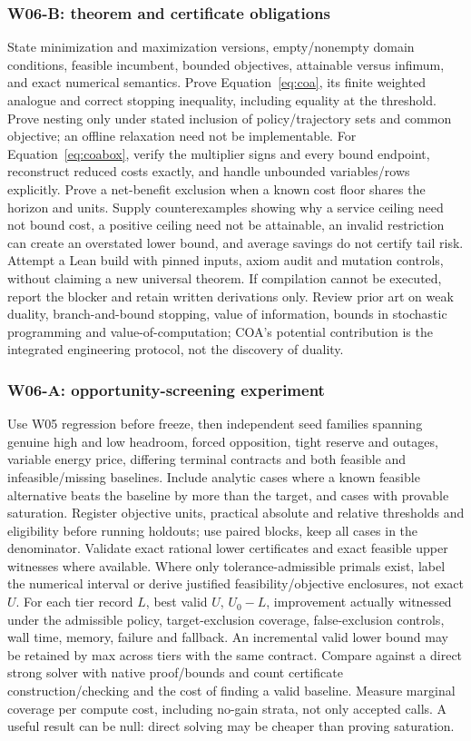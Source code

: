 \subsubsection{W06-B: theorem and certificate obligations}
State minimization and maximization versions, empty/nonempty domain conditions, feasible incumbent, bounded objectives, attainable versus infimum, and exact numerical semantics. Prove Equation~\ref{eq:coa}, its finite weighted analogue and correct stopping inequality, including equality at the threshold. Prove nesting only under stated inclusion of policy/trajectory sets and common objective; an offline relaxation need not be implementable. For Equation~\ref{eq:coabox}, verify the multiplier signs and every bound endpoint, reconstruct reduced costs exactly, and handle unbounded variables/rows explicitly. Prove a net-benefit exclusion when a known cost floor shares the horizon and units. Supply counterexamples showing why a service ceiling need not bound cost, a positive ceiling need not be attainable, an invalid restriction can create an overstated lower bound, and average savings do not certify tail risk. Attempt a Lean build with pinned inputs, axiom audit and mutation controls, without claiming a new universal theorem. If compilation cannot be executed, report the blocker and retain written derivations only. Review prior art on weak duality, branch-and-bound stopping, value of information, bounds in stochastic programming and value-of-computation; COA's potential contribution is the integrated engineering protocol, not the discovery of duality.

\subsubsection{W06-A: opportunity-screening experiment}
Use W05 regression before freeze, then independent seed families spanning genuine high and low headroom, forced opposition, tight reserve and outages, variable energy price, differing terminal contracts and both feasible and infeasible/missing baselines. Include analytic cases where a known feasible alternative beats the baseline by more than the target, and cases with provable saturation. Register objective units, practical absolute and relative thresholds and eligibility before running holdouts; use paired blocks, keep all cases in the denominator. Validate exact rational lower certificates and exact feasible upper witnesses where available. Where only tolerance-admissible primals exist, label the numerical interval or derive justified feasibility/objective enclosures, not exact $U$. For each tier record $L$, best valid $U$, $U_0-L$, improvement actually witnessed under the admissible policy, target-exclusion coverage, false-exclusion controls, wall time, memory, failure and fallback. An incremental valid lower bound may be retained by max across tiers with the same contract. Compare against a direct strong solver with native proof/bounds and count certificate construction/checking and the cost of finding a valid baseline. Measure marginal coverage per compute cost, including no-gain strata, not only accepted calls. A useful result can be null: direct solving may be cheaper than proving saturation.

